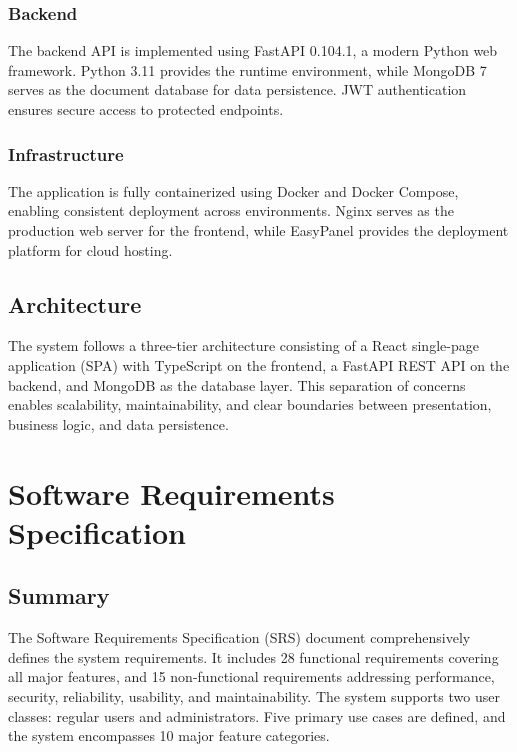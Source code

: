 \documentclass[12pt,a4paper]{report}
\begin{document}
\subsection{Backend}

The backend API is implemented using FastAPI 0.104.1, a modern Python web framework. Python 3.11 provides the runtime environment, while MongoDB 7 serves as the document database for data persistence. JWT authentication ensures secure access to protected endpoints.

\subsection{Infrastructure}

The application is fully containerized using Docker and Docker Compose, enabling consistent deployment across environments. Nginx serves as the production web server for the frontend, while EasyPanel provides the deployment platform for cloud hosting.

\section{Architecture}

The system follows a three-tier architecture consisting of a React single-page application (SPA) with TypeScript on the frontend, a FastAPI REST API on the backend, and MongoDB as the database layer. This separation of concerns enables scalability, maintainability, and clear boundaries between presentation, business logic, and data persistence.

\chapter{Software Requirements Specification}

\section{Summary}

The Software Requirements Specification (SRS) document comprehensively defines the system requirements. It includes 28 functional requirements covering all major features, and 15 non-functional requirements addressing performance, security, reliability, usability, and maintainability. The system supports two user classes: regular users and administrators. Five primary use cases are defined, and the system encompasses 10 major feature categories.
\end{document}
